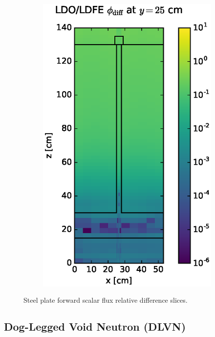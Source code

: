 \documentclass{article} %
\begin{document}
\begin{figure}[!htb]
\begin{subfigure}{0.4\textwidth}
\includegraphics[max height=0.445\textheight]
{img/steel-flux-diff-ldfe.eps}
\end{subfigure}
\caption{Steel plate forward scalar flux relative difference slices.}
\label{steel-fwd-diff-rel}
\end{figure}

\FloatBarrier
\subsection{Dog-Legged Void Neutron (DLVN)}
\end{document}
